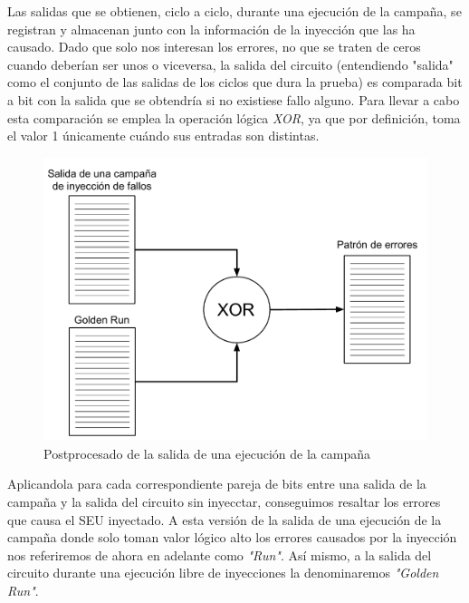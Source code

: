 Las salidas que se obtienen, ciclo a ciclo, durante una ejecución de la campaña, 
se registran y almacenan junto con la información de la inyección que las ha 
causado. Dado que solo nos interesan los errores, no que se traten de ceros cuando
deberían ser unos o viceversa, la salida del circuito (entendiendo "salida" como 
el conjunto de las salidas de los ciclos que dura la prueba) es comparada bit a 
bit con la salida que se obtendría si no existiese fallo alguno. Para llevar a 
cabo esta comparación se emplea la operación lógica \textit{XOR}, ya que por
definición, toma el valor 1 únicamente cuándo sus entradas son distintas.

\begin{figure}[htbp]
    \centering
    \includegraphics[width=0.95\linewidth]
    {InyeccionDeFallos/figuras/fig32.pdf}
    \caption{Postprocesado de la salida de una ejecución de la campaña}
    \label{fig:PostprocesadoSalida}
\end{figure}

Aplicandola para cada correspondiente pareja de bits entre una salida de la 
campaña y la salida del circuito sin inyecctar, conseguimos resaltar los errores
que causa el \gls{SEU} inyectado. A esta versión de la salida de una ejecución de
la campaña donde solo toman valor lógico alto los errores causados por la
inyección nos referiremos de ahora en adelante como \textit{"Run"}. Así mismo, a 
la salida del circuito durante una ejecución libre de inyecciones la denominaremos
\textit{"Golden Run"}.

